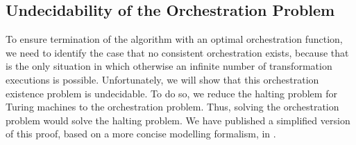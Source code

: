 



\subsection{Undecidability of the Orchestration Problem} %

To ensure termination of the  algorithm with an optimal orchestration function, we need to identify the case that no consistent orchestration exists, because that is the only situation in which otherwise an infinite number of transformation executions is possible.
Unfortunately, we will show that this orchestration existence problem is undecidable.
To do so, we reduce the halting problem for Turing machines to the orchestration problem.
Thus, solving the orchestration problem would solve the halting problem.
We have published a simplified version of this proof, based on a more concise modelling formalism, in \cite{gleitze2020orchestration}.

